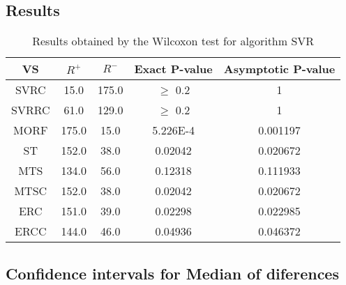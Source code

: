 \documentclass[a4paper,10pt]{article}
\begin{document}
\subsection{Results}

\begin{table}[!htp]
\centering\small
\begin{tabular}{
|c|c|c|c|c|}
\hline
 VS & $R^{+}$ & $R^{-}$ & Exact P-value & Asymptotic P-value \\ \hline 
SVRC & 15.0 & 175.0 & $\geq$ 0.2 & 1\\ \hline 
SVRRC & 61.0 & 129.0 & $\geq$ 0.2 & 1\\ \hline 
MORF & 175.0 & 15.0 & 5.226E-4 & 0.001197\\ \hline 
ST & 152.0 & 38.0 & 0.02042 & 0.020672\\ \hline 
MTS & 134.0 & 56.0 & 0.12318 & 0.111933\\ \hline 
MTSC & 152.0 & 38.0 & 0.02042 & 0.020672\\ \hline 
ERC & 151.0 & 39.0 & 0.02298 & 0.022985\\ \hline 
ERCC & 144.0 & 46.0 & 0.04936 & 0.046372\\ \hline 

\end{tabular}
\caption{Results obtained by the Wilcoxon test for algorithm SVR}
\end{table}

\subsection{Confidence intervals for Median of diferences}
\end{document}
